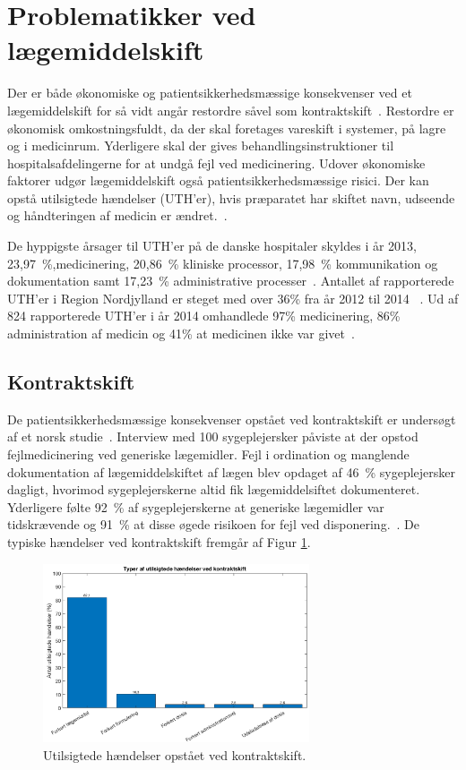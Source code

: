 \section{Problematikker ved lægemiddelskift}
Der er både økonomiske og patientsikkerhedsmæssige konsekvenser ved et lægemiddelskift for så vidt angår restordre såvel som kontraktskift~\citep{Amgros2015}. Restordre er økonomisk omkostningsfuldt, da der skal foretages vareskift i systemer, på lagre og i medicinrum. Yderligere skal der gives behandlingsinstruktioner til hospitalsafdelingerne for at undgå fejl ved medicinering. Udover økonomiske faktorer udgør lægemiddelskift også patientsikkerhedsmæssige risici. Der kan opstå utilsigtede hændelser (UTH'er), hvis præparatet har skiftet navn, udseende og håndteringen af medicin er ændret.~\citep{Amgros2015}. 

De hyppigste årsager til UTH'er på de danske hospitaler skyldes i år 2013, 23,97~\%,medicinering, 20,86~\% kliniske processor, 17,98~\% kommunikation og dokumentation samt 17,23~\% administrative processer~\citep{Patientombuddet2013}. Antallet af rapporterede UTH'er i Region Nordjylland er steget med over 36\% fra år 2012 til 2014 ~\citep{Jensen2014}. Ud af 824 rapporterede UTH'er i år 2014 omhandlede 97\% medicinering, 86\% administration af medicin og 41\% at medicinen ikke var givet~\citep{Jensen2014}. 

\subsection{Kontraktskift}
De patientsikkerhedsmæssige konsekvenser opstået ved kontraktskift er undersøgt af et norsk studie~\citep{Hakonsen2010}. Interview med 100 sygeplejersker påviste at der opstod fejlmedicinering ved generiske lægemidler. Fejl i ordination og manglende dokumentation af lægemiddelskiftet af lægen blev opdaget af 46~\% sygeplejersker dagligt, hvorimod sygeplejerskerne altid fik lægemiddelsiftet dokumenteret. Yderligere følte 92~\% af sygeplejerskerne at generiske lægemidler var tidskrævende og 91~\% at disse øgede risikoen for fejl ved disponering.~\citep{Hakonsen2010}. De typiske hændelser ved kontraktskift fremgår af Figur \ref{fig:UTHkontraktskift}.

\begin{figure}[H]\centering
	\includegraphics[width=0.7\textwidth]{billeder/UTH1.png} 
	\caption{Utilsigtede hændelser opstået ved kontraktskift\citep{Hakonsen2010}.}
	\label{fig:UTHkontraktskift}  
\end{figure}

